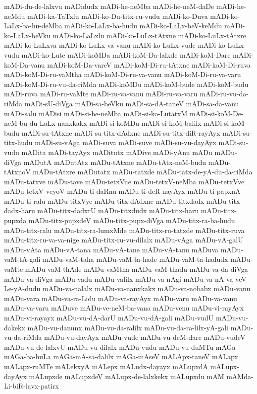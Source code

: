 {mADi-du-de-lalxvu
mADidudx
mADi-he-neMba
mADi-he-neM-daDe
mADi-he-neMdu
mADi-ka-TaTxlu
mADi-ko-Du-titx-ru-vudu
mADi-ko-Duva
mADi-ko-LaLx-ba-hu-deMba
mADi-ko-LaLx-ba-hudu
mADi-ko-LaLx-beV-keMdu
mADi-ko-LaLx-beVku
mADi-ko-LaLxlu
mADi-ko-LuLx-tAtxne
mADi-ko-LuLx-tAtxre
mADi-ko-LuLxva
mADi-ko-LuLx-va-vanu
mADi-ko-LuLx-vude
mADi-ko-LuLx-vudu
mADi-ko-Lute
mADi-koMDa
mADi-koM-Da-lalxde
mADi-koM-Dare
mADi-koM-Da-vanu
mADi-koM-Da-vareV
mADi-koM-Di-ru-tAtxne
mADi-koM-Di-ruva
mADi-koM-Di-ru-vaMtha
mADi-koM-Di-ru-va-vanu
mADi-koM-Di-ru-va-varu
mADi-koM-Di-ru-vu-da-riMda
mADi-koMDu
mADi-koM-bude
mADi-koM-budu
mADi-ruva
mADi-ru-vaMte
mADi-ru-va-vanu
mADi-ru-va-varu
mADi-ru-vu-da-riMda
mADi-sU-diVga
mADi-sa-beVku
mADi-sa-dA-taneV
mADi-sa-da-vanu
mADi-salu
mADisi
mADi-si-he-neMba
mADi-si-ko-LutatxM
mADi-si-koM-De-neM-bu-du-LaLx-nanxkakx
mADi-si-koMDu
mADi-si-koM-balilx
mADi-si-koM-budu
mADi-su-tAtxne
mADi-su-titx-dAdxne
mADi-su-titx-diR-rayAyx
mADi-su-titx-hudu
mADi-su-vAga
mADi-suva
mADi-suve
mADi-su-vu-dayAyx
mADi-su-vudu
mADita
mADi-tayAyx
mADitutx
mADive
mADi-yAnu
mADu
mADu-diVga
mADutA
mADutAtx
mADu-tAtxne
mADu-tAtx-neM-budu
mADu-tAtxnoV
mADu-tAtxre
mADutatx
mADu-tatxde
mADu-tatx-de-yA-du-da-riMda
mADu-tatxve
mADu-tave
mADu-tetxVne
mADu-tetxV-neMba
mADu-tetxVve
mADu-tetxV-veyoV
mADu-ti-daRnu
mADu-ti-deR-nayAyx
mADu-ti-papxnA
mADu-ti-ralu
mADu-titxVye
mADu-titx-dAdxne
mADu-titxdadx
mADu-titx-dadx-haru
mADu-titx-dadxrU
mADu-titxdudx
mADu-titx-haru
mADu-titx-pupxda
mADu-titx-pupxdeV
mADu-titx-pupx-diVga
mADu-titx-ra-ba-hudu
mADu-titx-ralu
mADu-titx-ra-lumxMde
mADu-titx-ru-tatxde
mADu-titx-ruva
mADu-titx-ru-va-va-nige
mADu-titx-ru-vu-dilalx
mADu-vAga
mADu-vA-galU
mADu-vAta
mADu-vA-tana
mADu-vA-tane
mADu-vA-tanu
mADuva
mADu-vaM-tA-gali
mADu-vaM-taha
mADu-vaM-ta-hade
mADu-vaM-ta-hadudx
mADu-vaMte
mADu-vaM-thAde
mADu-vaMtha
mADu-vaM-thadu
mADu-va-da-diVga
mADu-va-diVga
mADu-vadu
mADu-valilx
mADu-va-nAgi
mADu-va-nA-va-veV-Le-yA-dudu
mADu-va-nalalx
mADu-va-nanxkakx
mADu-va-nobabx
mADu-vanu
mADu-vara
mADu-va-ra-Lidu
mADu-va-rayAyx
mADu-varu
mADu-va-vanu
mADu-va-varu
mADuve
mADu-ve-neM-ba-vana
mADu-venu
mADu-vi-rayAyx
mADu-vi-rayayx
mADu-vu-dA-darU
mADu-vu-dA-gali
mADu-vudU
mADu-vu-dakekx
mADu-vu-danunx
mADu-vu-da-ralilx
mADu-vu-da-ra-lilx-yA-gali
mADu-vu-da-riMda
mADu-vu-dayAyx
mADu-vude
mADu-vu-deM-dare
mADu-vudeV
mADu-vu-de-lalxvU
mADu-vu-dilalx
mADu-vudu
mADu-vu-duMTu
mAGa
mAGa-ba-huLa
mAGa-mA-sa-dalilx
mAGa-mAseV
mALApx-taneV
mALapx
mALapx-ruMTe
mALekxyA
mALepx
mALudx-dayayx
mALupxdA
mALupx-dayAyx
mALupxde
mALupxdeV
mALupx-de-lalxkekx
mALupxdu
mAM
mAMda-Li-biR-lavx-patirx
}
